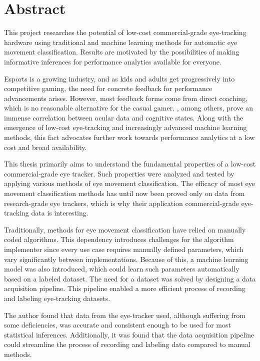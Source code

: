 \chapter*{Abstract} 

This project researches the potential of low-cost commercial-grade eye-tracking hardware using traditional and machine learning methods for automatic eye movement classification. Results are motivated by the possibilities of making informative inferences for performance analytics available for everyone.

Esports is a growing industry, and as kids and adults get progressively into competitive gaming, the need for concrete feedback for performance advancements arises. However, most feedback forms come from direct coaching, which is no reasonable alternative for the casual gamer. \cite{may1990}, among others, prove an immense correlation between ocular data and cognitive states. Along with the emergence of low-cost eye-tracking and increasingly advanced machine learning methods, this fact advocates further work towards performance analytics at a low cost and broad availability. 

This thesis primarily aims to understand the fundamental properties of a low-cost commercial-grade eye tracker. Such properties were analyzed and tested by applying various methods of eye movement classification. The efficacy of most eye movement classification methods has until now been proved only on data from research-grade eye trackers, which is why their application commercial-grade eye-tracking data is interesting.

Traditionally, methods for eye movement classification have relied on manually coded algorithms. This dependency introduces challenges for the algorithm implementer since every use case requires manually defined parameters, which vary significantly between implementations. Because of this, a machine learning model was also introduced, which could learn such parameters automatically based on a labeled dataset. The need for a dataset was solved by designing a data acquisition pipeline. This pipeline enabled a more efficient process of recording and labeling eye-tracking datasets. 

The author found that data from the eye-tracker used, although suffering from some deficiencies, was accurate and consistent enough to be used for most statistical inferences. Additionally, it was found that the data acquisition pipeline could streamline the process of recording and labeling data compared to manual methods. 
